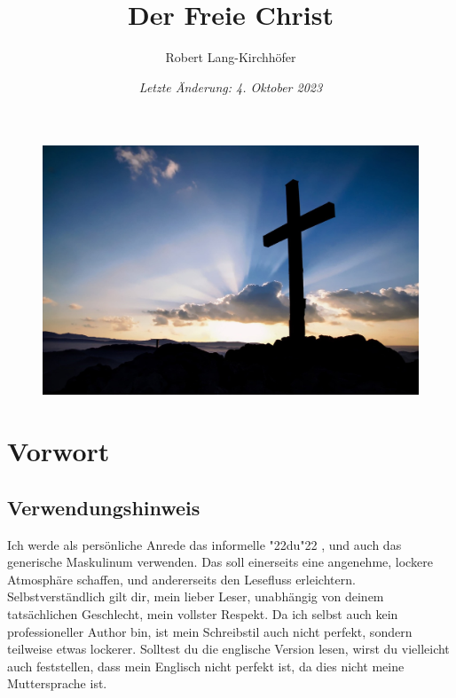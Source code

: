 \documentclass[12pt,a4paper]{article}
\title{\textbf{Der Freie Christ}}
\author{Robert Lang-Kirchh\"ofer}
\date{\textit{Letzte \"Anderung: 4. Oktober 2023}}
\newcommand{\q}[1]{\char"22{#1}\char"22 }
\begin{document}
	\setlength{\parindent}{0mm}
	\maketitle
	\begin{figure}[h]
		\centering
		\includegraphics[width=1\textwidth,keepaspectratio]{"FreeChristian.jpeg"}
	\end{figure}

	\newpage
	\tableofcontents
	
	\newpage
	\section{Vorwort}

	\subsection{Verwendungshinweis}
		Ich werde als pers\"onliche Anrede das informelle \q{du},
		und auch das generische Maskulinum verwenden.
		Das soll einerseits eine angenehme,
		lockere Atmosph\"are schaffen,
		und andererseits den Lesefluss erleichtern.
		Selbstverst\"andlich gilt dir,
		mein lieber Leser,
		unabh\"angig von deinem tats\"achlichen Geschlecht,
		mein vollster Respekt.
		Da ich selbst auch kein professioneller Author bin,
		ist mein Schreibstil auch nicht perfekt,
		sondern teilweise etwas lockerer.
		Solltest du die englische Version lesen,
		wirst du vielleicht auch feststellen,
		dass mein Englisch nicht perfekt ist,
		da dies nicht meine Muttersprache ist.
\end{document}

